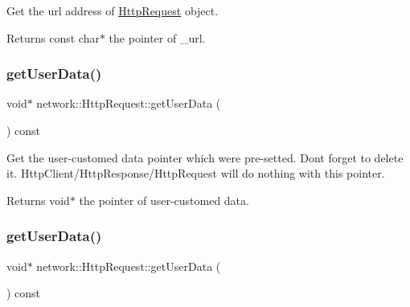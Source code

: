 Get the url address of \hyperlink{classnetwork_1_1HttpRequest}{Http\+Request} object.

\begin{DoxyReturn}{Returns}
const char$\ast$ the pointer of \+\_\+url. 
\end{DoxyReturn}
\mbox{\label{classnetwork_1_1HttpRequest_a54c3f127831cbe5ad995396a100972d6}} 
\subsubsection{\texorpdfstring{get\+User\+Data()}{getUserData()}\hspace{0.1cm}{\footnotesize\ttfamily [1/2]}}
{\footnotesize\ttfamily void$\ast$ network\+::\+Http\+Request\+::get\+User\+Data (\begin{DoxyParamCaption}{ }\end{DoxyParamCaption}) const\hspace{0.3cm}{\ttfamily [inline]}}

Get the user-\/customed data pointer which were pre-\/setted. Don\textquotesingle{}t forget to delete it. Http\+Client/\+Http\+Response/\+Http\+Request will do nothing with this pointer.

\begin{DoxyReturn}{Returns}
void$\ast$ the pointer of user-\/customed data. 
\end{DoxyReturn}
\mbox{\label{classnetwork_1_1HttpRequest_a54c3f127831cbe5ad995396a100972d6}} 
\subsubsection{\texorpdfstring{get\+User\+Data()}{getUserData()}\hspace{0.1cm}{\footnotesize\ttfamily [2/2]}}
{\footnotesize\ttfamily void$\ast$ network\+::\+Http\+Request\+::get\+User\+Data (\begin{DoxyParamCaption}{ }\end{DoxyParamCaption}) const\hspace{0.3cm}{\ttfamily [inline]}}

